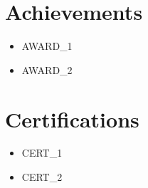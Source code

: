 \section{Achievements}
\begin{itemize}[leftmargin=0.15in]
    \item \small{ {{AWARD_1}} }
    \item \small{ {{AWARD_2}} }
\end{itemize}

\section{Certifications}
\begin{itemize}[leftmargin=0.15in]
    \item \small{ {{CERT_1}} }
    \item \small{ {{CERT_2}} }
\end{itemize}


